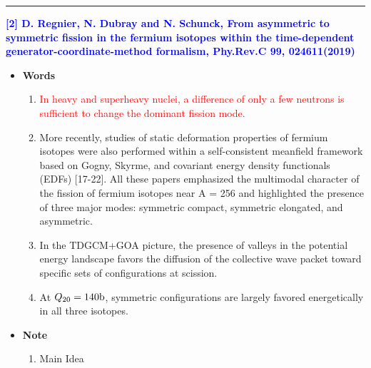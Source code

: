 \vspace{8pt}
\noindent\rule[0.25\baselineskip]{\textwidth}{2pt}
\noindent \textcolor{blue}{\textbf{[2] D. Regnier, N. Dubray and N. Schunck, From asymmetric to symmetric fission in the fermium isotopes within the time-dependent generator-coordinate-method formalism, Phy.Rev.C 99, 024611(2019)}}
\begin{itemize}[leftmargin=10pt]
    \item \textbf{Words}
    \begin{enumerate}[leftmargin=10pt]
        \item  \textcolor{red}{In heavy and superheavy nuclei, a difference of only a few neutrons is sufficient to change the dominant fission mode.}
        \item More recently, studies of static deformation properties of fermium isotopes were also performed within a self-consistent meanfield framework based on Gogny, Skyrme, and covariant energy density functionals (EDFs) [17-22]. All these papers emphasized the multimodal character of the fission of fermium isotopes near A = 256 and highlighted the presence of three major modes: symmetric compact, symmetric elongated, and asymmetric.
        \item In the TDGCM+GOA picture, the presence of valleys in the potential energy landscape favors the diffusion of the collective wave packet toward specific sets of configurations at scission.
        \item At $Q_{20}=140{\rm b}$, symmetric configurations are largely favored energetically in all three isotopes. 
    \end{enumerate}

    \vspace{5pt}
    \item \textbf{Note}
        \begin{enumerate}[leftmargin=10pt]
            \item Main Idea \newline
\end{enumerate}
\end{itemize}
